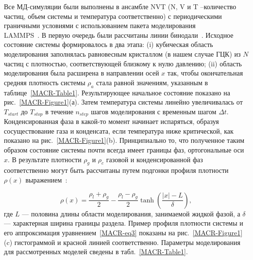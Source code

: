 Все МД-симуляции были выполнены в ансамбле NVT (N, V и T --количество частиц, объем системы и температура соответственно) с периодическими граничными условиями с использованием пакета моделирования \\  LAMMPS~\cite{10.1006/jcph.1995.1039}.
В первую очередь были рассчитаны линии бинодали~\cite{10.1021/jp806127j, 10.1021/jp1117213}.
Исходное состояние системы формировалось в два этапа: (i) кубическая область моделирования заполнялась равновесным кристаллом (в нашем случае ГЦК) из $N$ частиц с плотностью, соответствующей близкому к нулю давлению; 
(ii) область моделирования была расширена в направлении осей $x$ так, чтобы окончательная средняя плотность системы $\rho_a$ стала равной значениям, указанным в таблице~\ref{MACR-Table1}.
Результирующее начальное состояние показано на рис.~\ref{MACR-Figure1}(а). 
Затем температура системы линейно увеличивалась от $T_{start}$ до $T_{stop}$ в течение $n_{step}$ шагов моделирования с временным шагом $\Delta t$.
Конденсированная фаза в какой-то момент начинает испаряться, образуя сосуществование газа и конденсата, если температура ниже критической, как показано на рис.~\ref{MACR-Figure1}(b).
Принципиально то, что полученное таким образом состояние системы почти всегда имеет границы фаз, ортогональные оси $x$.
В результате плотности $\rho_g$ и $\rho_c$ газовой и конденсированной фаз соответственно могут быть рассчитаны путем подгонки профиля плотности $\rho(x)$ выражением~\cite{10.1021/jp806127j, 10.1021/jp1117213}:

\begin{equation}
    \rho(x)=\frac{\rho_{l}+\rho_{g}}{2}-\frac{\rho_{l}-\rho_{g}}{2} \tanh \left(\frac{|x|-L}{\delta}\right),
    \label{MACR-eq3}
\end{equation}
где $L$ — половина длины области моделирования, занимаемой жидкой фазой, а $\delta$ — характерная ширина границы раздела.
Пример профиля плотности системы и его аппроксимация уравнением~\eqref{MACR-eq3} показаны на рис.~\ref{MACR-Figure1}(c) гистограммой и красной линией соответственно.
Параметры моделирования для рассмотренных моделей сведены в табл.~\ref{MACR-Table1}.

